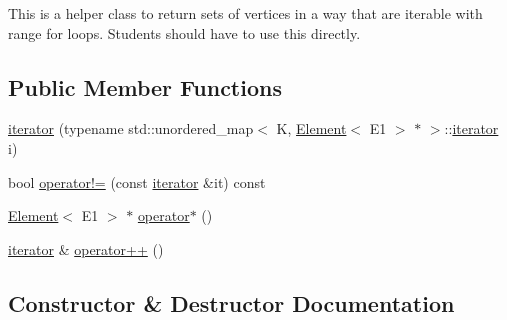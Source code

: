 This is a helper class to return sets of vertices in a way that are iterable with range for loops. Students should have to use this directly. \subsection*{Public Member Functions}
\begin{DoxyCompactItemize}
\item 
\hyperlink{classbridges_1_1datastructure_1_1_graph_adj_list_1_1_vertex_element_set__listhelper_1_1iterator_abbd97f84b3192386e6a0cf3c523d1d1a}{iterator} (typename std\+::unordered\+\_\+map$<$ K, \hyperlink{classbridges_1_1datastructure_1_1_element}{Element}$<$ E1 $>$ $\ast$ $>$\+::\hyperlink{classbridges_1_1datastructure_1_1_graph_adj_list_1_1_vertex_element_set__listhelper_1_1iterator}{iterator} i)
\item 
bool \hyperlink{classbridges_1_1datastructure_1_1_graph_adj_list_1_1_vertex_element_set__listhelper_1_1iterator_a1df44cf11b2aeec0c37379f6ccc9ebc0}{operator!=} (const \hyperlink{classbridges_1_1datastructure_1_1_graph_adj_list_1_1_vertex_element_set__listhelper_1_1iterator}{iterator} \&it) const
\item 
\hyperlink{classbridges_1_1datastructure_1_1_element}{Element}$<$ E1 $>$ $\ast$ \hyperlink{classbridges_1_1datastructure_1_1_graph_adj_list_1_1_vertex_element_set__listhelper_1_1iterator_aaa0fd15d94287beda7663ec69e89a42d}{operator$\ast$} ()
\item 
\hyperlink{classbridges_1_1datastructure_1_1_graph_adj_list_1_1_vertex_element_set__listhelper_1_1iterator}{iterator} \& \hyperlink{classbridges_1_1datastructure_1_1_graph_adj_list_1_1_vertex_element_set__listhelper_1_1iterator_aa66d21cb8b5cd0f8fdfc9bcab19cae84}{operator++} ()
\end{DoxyCompactItemize}


\subsection{Constructor \& Destructor Documentation}
\mbox{\label{classbridges_1_1datastructure_1_1_graph_adj_list_1_1_vertex_element_set__listhelper_1_1iterator_abbd97f84b3192386e6a0cf3c523d1d1a}} 

